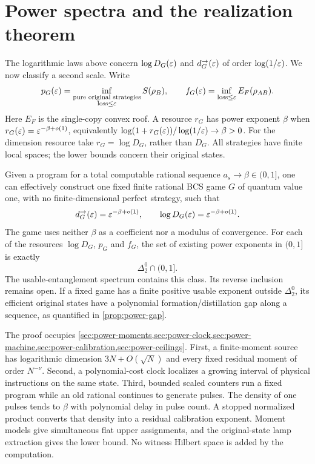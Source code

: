 \section{Power spectra and the realization theorem}\label{sec:power}
The logarithmic laws above concern $\log D_G(\varepsilon)$ and $d_G^\to(\varepsilon)$ of order $\log(1/\varepsilon)$. We now classify a second scale. Write
\[
 p_G(\varepsilon)=\inf_{\substack{\text{pure original strategies}\\\text{loss}\le\varepsilon}}S(\rho_B),\qquad
 f_G(\varepsilon)=\inf_{\text{loss}\le\varepsilon}E_F(\rho_{AB}).
\]
Here $E_F$ is the single-copy convex roof. A resource $r_G$ has power exponent $\beta$ when
$r_G(\varepsilon)=\varepsilon^{-\beta+o(1)}$, equivalently $\log(1+r_G(\varepsilon))/\log(1/\varepsilon)\to\beta>0$.
For the dimension resource take $r_G=\log D_G$, rather than $D_G$. All strategies have finite local spaces; the lower bounds concern their original states.

\begin{theorem}\label{thm:power-realization}
Given a program for a total computable rational sequence $a_s\to\beta\in(0,1]$, one can effectively construct one fixed finite rational BCS game $G$ of quantum value one, with no finite-dimensional perfect strategy, such that
\[
 d_G^\to(\varepsilon)=\varepsilon^{-\beta+o(1)},\qquad \log D_G(\varepsilon)=\varepsilon^{-\beta+o(1)}.
\]
The game uses neither $\beta$ as a coefficient nor a modulus of convergence.
For each of the resources $\log D_G$, $p_G$ and $f_G$, the set of existing power exponents in $(0,1]$ is exactly
\[
 \Delta^0_2\cap(0,1].
\]
The usable-entanglement spectrum contains this class. Its reverse inclusion remains open. If a fixed game has a finite positive usable exponent outside $\Delta^0_2$, its efficient original states have a polynomial formation/distillation gap along a sequence, as quantified in \cref{prop:power-gap}.
\end{theorem}

The proof occupies \cref{sec:power-moments,sec:power-clock,sec:power-machine,sec:power-calibration,sec:power-ceilings}.
First, a finite-moment source has logarithmic dimension $3N+O(\sqrt N)$ and every fixed residual moment of order $N^{-\nu}$. Second, a polynomial-cost clock localizes a growing interval of physical instructions on the same state. Third, bounded scaled counters run a fixed program while an old rational continues to generate pulses. The density of one pulses tends to $\beta$ with polynomial delay in pulse count. A stopped normalized product converts that density into a residual calibration exponent. Moment models give simultaneous flat upper assignments, and the original-state lamp extraction gives the lower bound. No witness Hilbert space is added by the computation.

